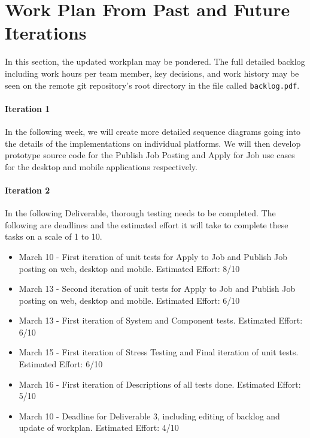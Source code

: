 \documentclass[12pt]{report}
\begin{document}
\part{Work Plan From Past and Future Iterations}
In this section, the updated workplan may be pondered. The full detailed backlog including work
hours per team member, key decisions, and work history may be seen on the remote git repository's
root directory in the file called \texttt{backlog.pdf}.
\subsection{Iteration 1}

In the following week, we will create more detailed sequence diagrams going into the details of the
implementations on individual platforms. We will then develop prototype source code for the Publish
Job Posting and Apply for Job use cases for the desktop and mobile applications respectively.

\subsection{Iteration 2}

In the following Deliverable, thorough testing needs to be completed. The following are deadlines
and the estimated effort it will take to complete these tasks on a scale of 1 to 10.

\begin{itemize}
	\item March 10 - First iteration of unit tests for Apply to Job and Publish Job posting on web,
		desktop and mobile. Estimated Effort: 8/10
	\item March 13 - Second iteration of unit tests for Apply to Job and Publish Job posting on web,
		desktop and mobile. Estimated Effort: 6/10
	\item March 13 - First iteration of System and Component tests. Estimated Effort: 6/10
    \item March 15 - First iteration of Stress Testing and Final iteration of unit tests. Estimated Effort: 6/10
    \item March 16 - First iteration of Descriptions of all tests done. Estimated Effort: 5/10
	\item March 10 - Deadline for Deliverable 3, including editing of backlog and update of
		workplan. Estimated Effort: 4/10

\end{itemize}
\end{document}
